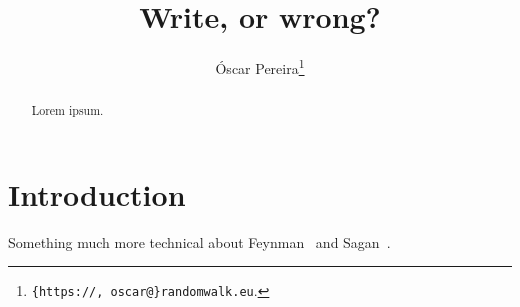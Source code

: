 \documentclass[a4paper,12pt,dvipsnames*]{article}
\title{
Write, or wrong?
}
\author{
  Óscar Pereira\footnote{\texttt{\{https://, oscar@\}randomwalk.eu}.}
}
\date{\vspace{-2em}}
\begin{document}
\maketitle

\begin{abstract}
  Lorem ipsum.
\end{abstract}

\section{Introduction}
  \label{sec:intro}
  Something much more technical about Feynman~\cite{Feynman74} and Sagan~\cite{Sagan}.

\iffootnotesonly
\else
  \printendnotes
\fi

{}


\end{document}
